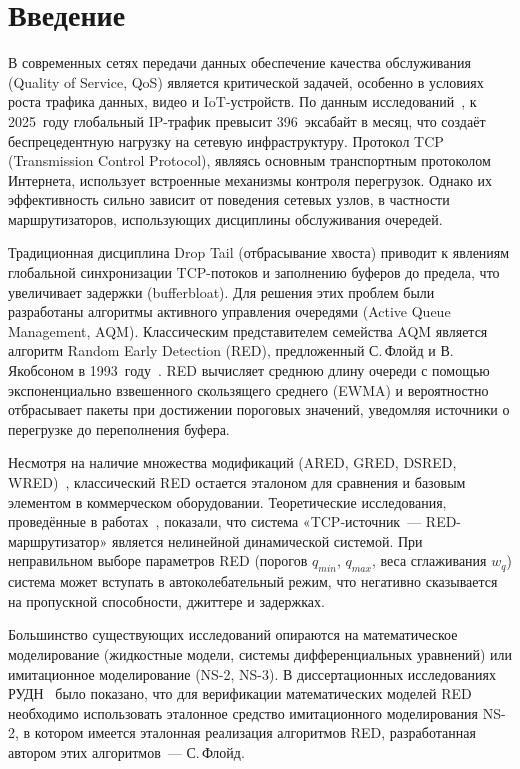 \documentclass[%
]{ittmm}
\begin{document}
\maketitle


\section{Введение}

В современных сетях передачи данных обеспечение качества обслуживания (Quality of Service, QoS) является критической задачей, особенно в условиях роста трафика данных, видео и IoT-устройств. По данным исследований~\cite{floyd1993random}, к 2025~году глобальный IP-трафик превысит 396~эксабайт в месяц, что создаёт беспрецедентную нагрузку на сетевую инфраструктуру. Протокол TCP (Transmission Control Protocol), являясь основным транспортным протоколом Интернета, использует встроенные механизмы контроля перегрузок. Однако их эффективность сильно зависит от поведения сетевых узлов, в частности маршрутизаторов, использующих дисциплины обслуживания очередей.

Традиционная дисциплина Drop Tail (отбрасывание хвоста) приводит к явлениям глобальной синхронизации TCP-потоков и заполнению буферов до предела, что увеличивает задержки (bufferbloat). Для решения этих проблем были разработаны алгоритмы активного управления очередями (Active Queue Management, AQM). Классическим представителем семейства AQM является алгоритм Random Early Detection (RED), предложенный С.\,Флойд и В.\,Якобсоном в 1993~году~\cite{floyd1993random}. RED вычисляет среднюю длину очереди с помощью экспоненциально взвешенного скользящего среднего (EWMA) и вероятностно отбрасывает пакеты при достижении пороговых значений, уведомляя источники о перегрузке до переполнения буфера.

Несмотря на наличие множества модификаций (ARED, GRED, DSRED, WRED)~\cite{korolkova2010phd}, классический RED остается эталоном для сравнения и базовым элементом в коммерческом оборудовании. Теоретические исследования, проведённые в работах~\cite{korolkova2010phd, velieva2019phd}, показали, что система «TCP-источник~--- RED-маршрутизатор» является нелинейной динамической системой. При неправильном выборе параметров RED (порогов $q_{min}$, $q_{max}$, веса сглаживания $w_q$) система может вступать в автоколебательный режим, что негативно сказывается на пропускной способности, джиттере и задержках.

Большинство существующих исследований опираются на математическое моделирование (жидкостные модели, системы дифференциальных уравнений) или имитационное моделирование (NS-2, NS-3). В диссертационных исследованиях РУДН~\cite{korolkova2010phd, velieva2019phd} было показано, что для верификации математических моделей RED необходимо использовать эталонное средство имитационного моделирования NS-2, в котором имеется эталонная реализация алгоритмов RED, разработанная автором этих алгоритмов~--- С.\,Флойд.
\end{document}
